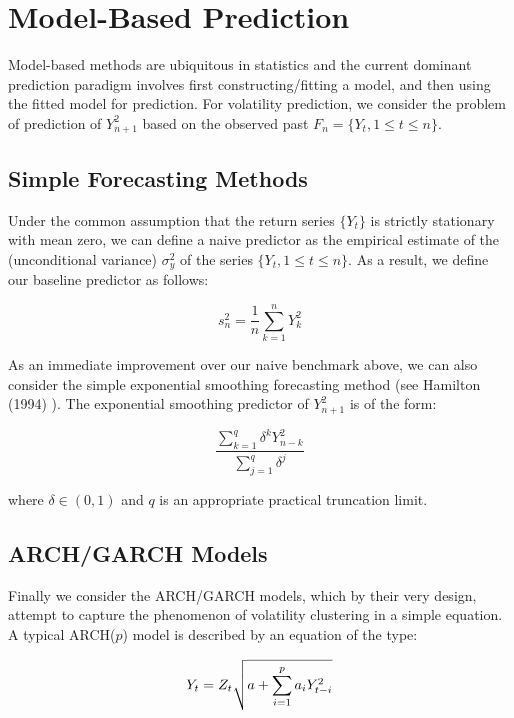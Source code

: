 \documentclass[11pt,]{article}
\begin{document}
\section{Model-Based Prediction} \label{sec:garch}

Model-based methods are ubiquitous in statistics and the current dominant prediction paradigm involves first constructing/fitting a model, and then using the fitted model for prediction. For volatility prediction, we consider the problem of prediction of $Y_{n+1}^2$ based on the observed past $F_n = \{Y_t, 1\leq t \leq n \}$.

\subsection{Simple Forecasting Methods}

Under the common assumption that the return series $\{Y_t\}$ is strictly stationary with mean zero, we can define a naive predictor as the empirical estimate of the (unconditional variance) $\sigma_{y}^2$ of the series $\{Y_t, 1\leq t \leq n \}$. As a result, we define our baseline predictor as follows: 

\begin{equation}
s_{n}^2 = \frac{1}{n} \sum_{k=1}^{n} Y_{k}^2
\end{equation}

As an immediate improvement over our naive benchmark above, we can also consider the simple exponential smoothing forecasting method (see Hamilton (1994) \cite{Hamilton1994}). The exponential smoothing predictor of $Y_{n+1}^2$ is of the form:

\begin{equation}
\frac{\sum_{k=1}^{q} \delta^k Y_{n-k}^2}{\sum_{j=1}^{q}\delta^j}
\end{equation}

where $\delta \in (0,1)$ and $q$ is an appropriate practical truncation limit.

\subsection{ARCH/GARCH Models}

Finally we consider the ARCH/GARCH models, which by their very design, attempt to capture the phenomenon of volatility clustering in a simple equation. A typical ARCH($p$) model is described by an equation of the type:

\begin{equation}
Y_t = Z_t \sqrtsign{a + \sum_{i=1}^p a_i Y_{t-i}^2}
\end{equation}
\end{document}
